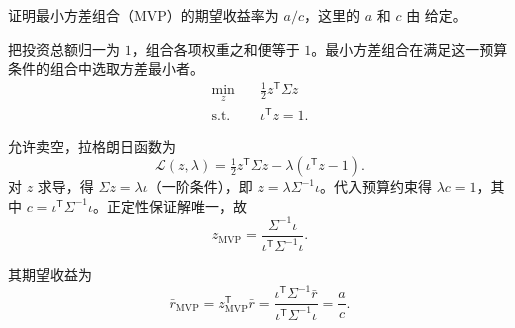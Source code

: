 \par\noindent\begin{minipage}{\linewidth}
\begin{problem}
 证明最小方差组合（MVP）的期望收益率为 $a/c$，这里的 $a$ 和 $c$ 由 给定。
\end{problem}
\end{minipage}\par
{}
\begin{solution}[label-content={证明}]
把投资总额归一为 $1$，组合各项权重之和便等于 $1$。最小方差组合在满足这一预算条件的组合中选取方差最小者。
\[
 \begin{aligned}
 \min_z\quad &\tfrac12 z^{\mathsf T}\Sigma z\\
 \text{s.t.}\quad &\iota^{\mathsf T}z=1.
 \end{aligned}
\]

允许卖空，拉格朗日函数为
\[
 \mathcal L(z,\lambda)=\tfrac12 z^{\mathsf T}\Sigma z-\lambda(\iota^{\mathsf T}z-1).
\]
对 $z$ 求导，得 $\Sigma z=\lambda\iota$（一阶条件），即 $z=\lambda\Sigma^{-1}\iota$。代入预算约束得 $\lambda c=1$，其中 $c=\iota^{\mathsf T}\Sigma^{-1}\iota$。正定性保证解唯一，故
\[
 z_{\mathrm{MVP}}=\frac{\Sigma^{-1}\iota}{\iota^{\mathsf T}\Sigma^{-1}\iota}.
\]

其期望收益为
\[
 \boxed{\bar r_{\mathrm{MVP}}=z_{\mathrm{MVP}}^{\mathsf T}\bar r
 =\frac{\iota^{\mathsf T}\Sigma^{-1}\bar r}
 {\iota^{\mathsf T}\Sigma^{-1}\iota}=\frac ac}.
\]
\end{solution}

